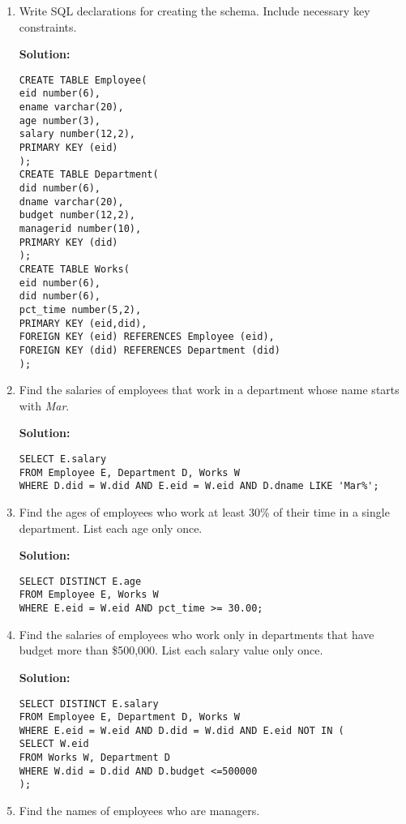 \begin{enumerate}
\item Write SQL declarations for creating the schema. Include necessary key constraints.

\textbf{Solution:}

\begin{verbatim}
CREATE TABLE Employee(
eid number(6),
ename varchar(20),
age number(3),
salary number(12,2),
PRIMARY KEY (eid)
);
CREATE TABLE Department(
did number(6),
dname varchar(20),
budget number(12,2),
managerid number(10),
PRIMARY KEY (did)
);
CREATE TABLE Works(
eid number(6),
did number(6),
pct_time number(5,2),
PRIMARY KEY (eid,did),
FOREIGN KEY (eid) REFERENCES Employee (eid),
FOREIGN KEY (did) REFERENCES Department (did)
);
\end{verbatim}

\item Find the salaries of employees that work in a department whose name starts with \textit{Mar}.

\textbf{Solution:}

\begin{verbatim}
SELECT E.salary
FROM Employee E, Department D, Works W
WHERE D.did = W.did AND E.eid = W.eid AND D.dname LIKE 'Mar%';
\end{verbatim}

\item Find the ages of employees who work at least 30\% of their time in a single department. List each age only once.

\textbf{Solution:}

\begin{verbatim}
SELECT DISTINCT E.age
FROM Employee E, Works W
WHERE E.eid = W.eid AND pct_time >= 30.00;
\end{verbatim}

\item Find the salaries of employees who work only  in departments that have budget more than \$500,000. List each salary value only once.

\textbf{Solution:}

\begin{verbatim}
SELECT DISTINCT E.salary
FROM Employee E, Department D, Works W
WHERE E.eid = W.eid AND D.did = W.did AND E.eid NOT IN (
SELECT W.eid
FROM Works W, Department D
WHERE W.did = D.did AND D.budget <=500000
);
\end{verbatim}

\item Find the names of employees who are managers.


\end{enumerate}
